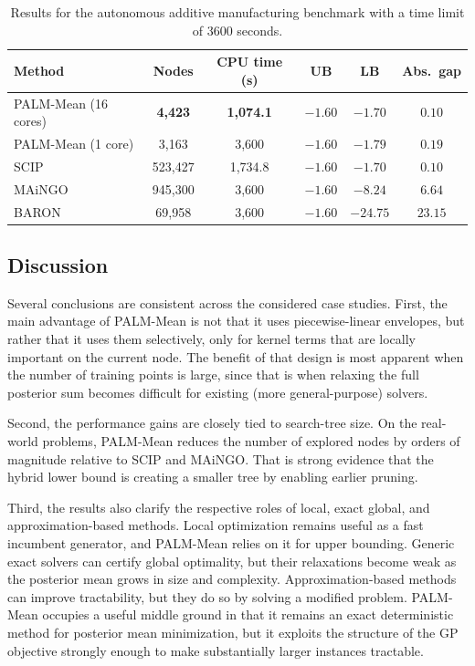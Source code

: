 \documentclass[pdflatex,sn-mathphys-num]{sn-jnl}%
\theoremstyle{thmstyleone}%
\theoremstyle{thmstyletwo}%
\theoremstyle{thmstylethree}%
\begin{document}
\begin{table}[t]
    \centering
    \caption{Results for the autonomous additive manufacturing benchmark with a time limit of $3600$ seconds.}
    \label{tab:autoam_results}
    \begin{tabular}{lccccc}
        \toprule
        Method & Nodes & CPU time (s) & UB & LB & Abs.\ gap \\
        \midrule
        PALM-Mean (16 cores) & \textbf{4,423} & \textbf{1,074.1} & $-1.60$ & $-1.70$ & $0.10$ \\
        PALM-Mean (1 core)   & 3,163          & 3,600            & $-1.60$ & $-1.79$ & $0.19$ \\
        SCIP                 & 523,427        & 1,734.8          & $-1.60$ & $-1.70$ & $0.10$ \\
        MAiNGO               & 945,300        & 3,600            & $-1.60$ & $-8.24$ & $6.64$ \\
        BARON                & 69,958         & 3,600            & $-1.60$ & $-24.75$ & $23.15$ \\
        \bottomrule
    \end{tabular}
\end{table}

\subsection{Discussion}

Several conclusions are consistent across the considered case studies. First, the main advantage of PALM-Mean is not that it uses piecewise-linear envelopes, but rather that it uses them selectively, only for kernel terms that are locally important on the current node. The benefit of that design is most apparent when the number of training points is large, since that is when relaxing the full posterior sum becomes difficult for existing (more general-purpose) solvers.

Second, the performance gains are closely tied to search-tree size. On the real-world problems, PALM-Mean reduces the number of explored nodes by orders of magnitude relative to SCIP and MAiNGO. That is strong evidence that the hybrid lower bound is creating a smaller tree by enabling earlier pruning.

Third, the results also clarify the respective roles of local, exact global, and approximation-based methods. Local optimization remains useful as a fast incumbent generator, and PALM-Mean relies on it for upper bounding. Generic exact solvers can certify global optimality, but their relaxations become weak as the posterior mean grows in size and complexity. Approximation-based methods can improve tractability, but they do so by solving a modified problem. PALM-Mean occupies a useful middle ground in that it remains an exact deterministic method for posterior mean minimization, but it exploits the structure of the GP objective strongly enough to make substantially larger instances tractable.
\end{document}
